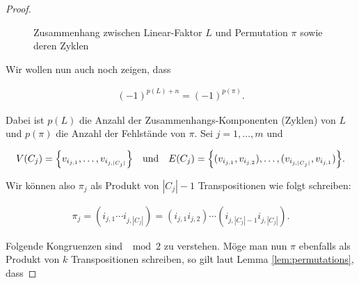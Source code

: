 \begin{proof}
\begin{figure}[h!]

                    \caption{Zusammenhang zwischen Linear-Faktor $L$ und Permutation $\pi$ sowie deren Zyklen}
                    \label{fig:pi_vs_L}
                \end{figure}

                Wir wollen nun auch noch zeigen, dass

                \begin{align} \label{eq:signs}
                    (-1)^{p(L) + n} = (-1)^{p(\pi)}.
                \end{align}

                Dabei ist $p(L)$ die Anzahl der Zusammenhangs-Komponenten (Zyklen) von $L$ und $p(\pi)$ die Anzahl der Fehlstände von $\pi$.
                Sei $j = 1, \dots, m$ und

                \begin{align*}
                    V(C_j) = {\left \{ v_{i_{j, 1}}, \dots, v_{i_{j, |C_j|}} \right \}}
                    \quad
                    \text{und}
                    \quad
                    E(C_j) = {\left \{ (v_{i_{j, 1}}, v_{i_{j, 2}}), \dots, (v_{i_{j, |C_j|}}, v_{i_{j, 1}}) \right \}}.
                \end{align*}

                Wir können also $\pi_j$ als Produkt von $|C_j| - 1$ Transpositionen wie folgt schreiben:

                \begin{align*}
                    \pi_j
                    =
                    (i_{j, 1} \cdots i_{j, |C_j|})
                    =
                    (i_{j, 1} i_{j, 2}) \cdots (i_{j, |C_j|-1} i_{j, |C_j|}).
                \end{align*}

                Folgende Kongruenzen sind $\mod 2$ zu verstehen.
                Möge man nun $\pi$ ebenfalls als Produkt von $k$ Transpositionen schreiben, so gilt laut Lemma \ref{lem:permutations}, dass


\end{proof}
